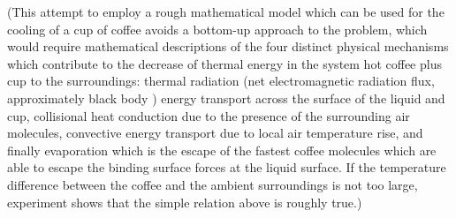 \documentclass[11pt]{article}
\begin{document}
\noindent (This attempt to employ a rough mathematical model which
  can be used for the cooling of a cup of coffee avoids a bottom-up approach
  to the problem, which would require 
  mathematical descriptions of the four distinct physical mechanisms which contribute
  to the decrease of thermal energy in the system hot coffee plus cup to 
  the surroundings: thermal radiation 
  (net electromagnetic radiation flux, approximately black body )  energy transport across the
  surface of the liquid and cup, collisional heat conduction due to the presence of the surrounding 
  air molecules, convective energy transport due to local air temperature rise,  
  and finally evaporation which is the escape of the fastest coffee molecules
  which are able to escape the binding surface forces at the liquid surface.
If the temperature difference between the coffee and the ambient surroundings is not
  too large, experiment shows that the simple relation above is roughly true.)\\
\end{document}
